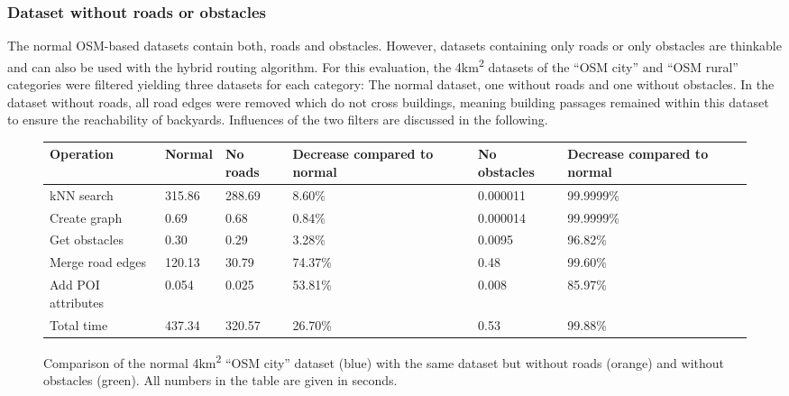 		\subsubsection{Dataset without roads or obstacles}
		\label{subsubsec:dataset-without-roads-obstacles}
		
			The normal OSM-based datasets contain both, roads and obstacles.
			However, datasets containing only roads or only obstacles are thinkable and can also be used with the hybrid routing algorithm.
			For this evaluation, the 4km\textsuperscript{2} datasets of the \enquote{OSM city} and \enquote{OSM rural} categories were filtered yielding three datasets for each category:
			The normal dataset, one without roads and one without obstacles.
			In the dataset without roads, all road edges were removed which do not cross buildings, meaning building passages remained within this dataset to ensure the reachability of backyards.
			Influences of the two filters are discussed in the following.
			
			\begin{figure}[h!]
				\begin{figcenter}
					\begin{tabularx}{0.95\textwidth}{p{3cm}XXXp{2.25cm}X}
\toprule
\textbf{Operation}	& \textbf{Normal}	& \textbf{No roads}	& \textbf{Decrease compared to normal}	& \textbf{No obstacles}	& \textbf{Decrease compared to normal}	\\
\midrule
kNN search			& 315.86			& 288.69			&  8.60\%								& 0.000011				& 99.9999\%								\\
Create graph		&   0.69			&   0.68			&  0.84\%								& 0.000014				& 99.9999\%								\\
Get obstacles		&   0.30			&   0.29			&  3.28\%								& 0.0095				& 96.82\%								\\
Merge road edges	& 120.13			&  30.79			& 74.37\%								& 0.48					& 99.60\%								\\
Add POI attributes	&   0.054			&   0.025			& 53.81\%								& 0.008					& 85.97\%								\\
\midrule
Total time			& 437.34			& 320.57			& 26.70\%								& 0.53					& 99.88\%								\\
\bottomrule
					\end{tabularx}
				\end{figcenter}
				\vspace{3ex}
				\begin{figcenter}
					
				\end{figcenter}
				\caption{Comparison of the normal 4km\textsuperscript{2} \enquote{OSM city} dataset (blue) with the same dataset but without roads (orange) and without obstacles (green). All numbers in the table are given in seconds.}
				\label{fig:eval-import-osm-no-roads-obstacles-city}
			\end{figure}
			
